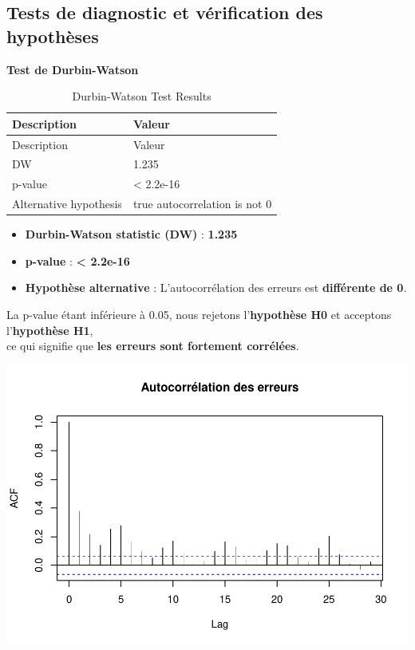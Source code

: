 \documentclass[
  12pt,
]{article}
\providecommand{\tightlist}{%
  \setlength{\itemsep}{0pt}\setlength{\parskip}{0pt}}
\begin{document}
\subsection{Tests de diagnostic et vérification des
hypothèses}\label{tests-de-diagnostic-et-vuxe9rification-des-hypothuxe8ses}

\textbf{Test de Durbin-Watson}

\begin{longtable}[]{@{}ll@{}}
\caption{Durbin-Watson Test Results}\tabularnewline
\toprule\noalign{}
Description & Valeur \\
\midrule\noalign{}
\endfirsthead
\toprule\noalign{}
Description & Valeur \\
\midrule\noalign{}
\endhead
\bottomrule\noalign{}
\endlastfoot
DW & 1.235 \\
p-value & \textless{} 2.2e-16 \\
Alternative hypothesis & true autocorrelation is not 0 \\
\end{longtable}

\begin{itemize}
\tightlist
\item
  \textbf{Durbin-Watson statistic (DW)} : \textbf{1.235}\\
\item
  \textbf{p-value} : \textbf{\textless{} 2.2e-16}\\
\item
  \textbf{Hypothèse alternative} : L'autocorrélation des erreurs est
  \textbf{différente de 0}.
\end{itemize}

La p-value étant inférieure à 0.05, nous rejetons l'\textbf{hypothèse
H0} et acceptons l'\textbf{hypothèse H1},\\
ce qui signifie que \textbf{les erreurs sont fortement corrélées}.

\includegraphics{rmd_final_files/figure-latex/unnamed-chunk-38-1.pdf}
\end{document}
